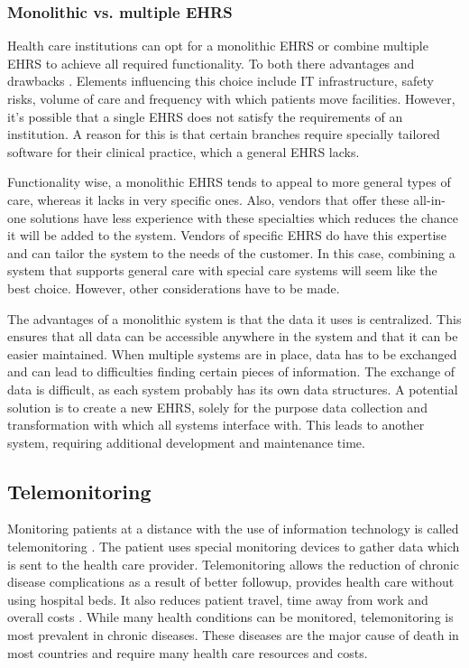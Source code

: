        \subsubsection{Monolithic vs. multiple EHRS} \label{ehrs_comparison}

        Health care institutions can opt for a monolithic EHRS or combine multiple EHRS to achieve all required functionality. To both there advantages and drawbacks \cite{multiple_ehrs}. Elements influencing this choice include IT infrastructure, safety risks, volume of care and frequency with which patients move facilities. However, it's possible that a single EHRS does not satisfy the requirements of an institution. A reason for this is that certain branches require specially tailored software for their clinical practice, which a general EHRS lacks. 

        Functionality wise, a monolithic EHRS tends to appeal to more general types of care, whereas it lacks in very specific ones. Also, vendors that offer these all-in-one solutions have less experience with these specialties which reduces the chance it will be added to the system. Vendors of specific EHRS do have this expertise and can tailor the system to the needs of the customer. In this case, combining a system that supports general care with special care systems will seem like the best choice. However, other considerations have to be made.

        The advantages of a monolithic system is that the data it uses is centralized. This ensures that all data can be accessible anywhere in the system and that it can be easier maintained. When multiple systems are in place, data has to be exchanged and can lead to difficulties finding certain pieces of information. The exchange of data is difficult, as each system probably has its own data structures. A potential solution is to create a new EHRS, solely for the purpose data collection and transformation with which all systems interface with. This leads to another system, requiring additional development and maintenance time.
    
    \subsection{Telemonitoring} \label{2_telemonitoring}
    Monitoring patients at a distance with the use of information technology is called telemonitoring \cite{systematic_review}. The patient uses special monitoring devices to gather data which is sent to the health care provider. Telemonitoring allows the reduction of chronic disease complications as a result of better followup, provides health care without using hospital beds. It also reduces patient travel, time away from work and overall costs \cite{telemonitoring_current_state}. While many health conditions can be monitored, telemonitoring is most prevalent in chronic diseases. These diseases are the major cause of death in most countries and require many health care resources and costs.

